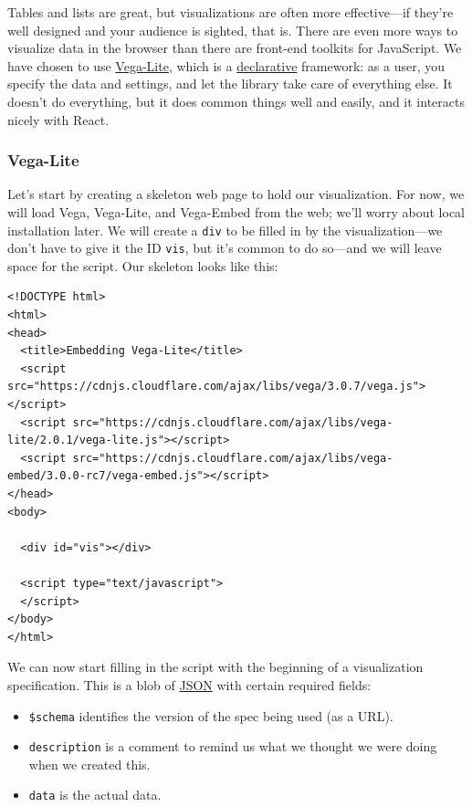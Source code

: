 Tables and lists are great, but visualizations are often more
effective---if they're well designed and your audience is sighted, that
is. There are even more ways to visualize data in the browser than there
are front-end toolkits for JavaScript. We have chosen to use
\href{http://vega.github.io/}{Vega-Lite}, which is a
\protect\hyperlink{g:declarative-programming}{declarative} framework: as
a user, you specify the data and settings, and let the library take care
of everything else. It doesn't do everything, but it does common things
well and easily, and it interacts nicely with React.

\subsubsection{Vega-Lite}\label{s:vis-vega-lite}

Let's start by creating a skeleton web page to hold our visualization.
For now, we will load Vega, Vega-Lite, and Vega-Embed from the web;
we'll worry about local installation later. We will create a
\texttt{div} to be filled in by the visualization---we don't have to
give it the ID \texttt{vis}, but it's common to do so---and we will
leave space for the script. Our skeleton looks like this:

\begin{verbatim}
<!DOCTYPE html>
<html>
<head>
  <title>Embedding Vega-Lite</title>
  <script src="https://cdnjs.cloudflare.com/ajax/libs/vega/3.0.7/vega.js"></script>
  <script src="https://cdnjs.cloudflare.com/ajax/libs/vega-lite/2.0.1/vega-lite.js"></script>
  <script src="https://cdnjs.cloudflare.com/ajax/libs/vega-embed/3.0.0-rc7/vega-embed.js"></script>
</head>
<body>

  <div id="vis"></div>

  <script type="text/javascript">
  </script>
</body>
</html>
\end{verbatim}

We can now start filling in the script with the beginning of a
visualization specification. This is a blob of
\protect\hyperlink{g:json}{JSON} with certain required fields:

\begin{itemize}
\tightlist
\item
  \texttt{\$schema} identifies the version of the spec being used (as a
  URL).
\item
  \texttt{description} is a comment to remind us what we thought we were
  doing when we created this.
\item
  \texttt{data} is the actual data.
\end{itemize}

